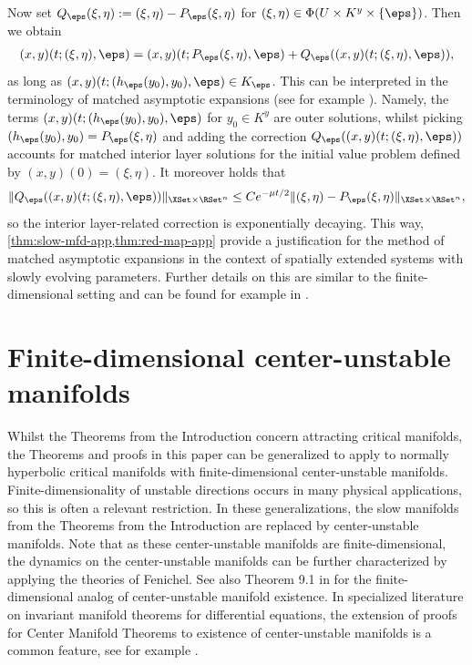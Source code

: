 \documentclass[a4paper]{siamart190516}
\begin{document}
 Now set $Q_{\eps}(\xi,\eta) := (\xi,\eta) - P_{\eps} (\xi,\eta)$ for $(\xi,\eta) \in \Phi(U \times K^y \times \{ \eps\})$. Then we obtain
\begin{align*}
(x,y)(t; (\xi,\eta),\eps) =  (x,y)(t; P_{\eps}(\xi,\eta),\eps) + Q_{\eps}((x,y)(t; (\xi,\eta),\eps)),
\end{align*}
as long as $(x,y)(t; (h_{\eps}(y_0),y_0),\eps) \in K_{\eps}$. This can be interpreted in the terminology of matched asymptotic expansions (see for example \cite{Ve05}). Namely, the terms $(x,y)(t; (h_{\eps}(y_0),y_0),\eps)$ for $y_0 \in K^y$ are outer solutions, whilst picking $(h_{\eps}(y_0),y_0) = P_{\eps}(\xi,\eta)$ and adding the correction $Q_{\eps}((x,y)(t; (\xi,\eta),\eps))$ accounts for matched interior layer solutions for the initial value problem defined by $(x,y)(0) = (\xi,\eta)$. It moreover holds that
\[
 \| Q_{\eps}((x,y)(t; (\xi,\eta),\eps)) \|_{\XSet \times \RSet^n} \leq  C e^{-\mu t / 2} \| (\xi,\eta) - P_{\eps}(\xi,\eta) \|_{\XSet \times \RSet^n},
\]
so the interior layer-related correction is exponentially decaying. This way,
\cref{thm:slow-mfd-app,thm:red-map-app} provide a justification for the
method of matched asymptotic expansions in the context of spatially extended systems
with slowly evolving parameters. Further details on this are similar to the
finite-dimensional setting and can be found for example in \cite{Sa90, DJFu96, Ve05}. 



  
  \section{Finite-dimensional center-unstable manifolds}\label{sec:cu-manifolds}
 Whilst the Theorems from the Introduction concern attracting critical manifolds, the Theorems and proofs in this paper can be generalized to apply to normally hyperbolic critical manifolds with finite-dimensional center-unstable manifolds. Finite-dimensionality of unstable directions occurs in many physical applications, so this is often a relevant restriction. In these generalizations, the slow manifolds from the Theorems from the Introduction are replaced by center-unstable manifolds. Note that as these center-unstable manifolds are finite-dimensional, the dynamics on the center-unstable manifolds can be further characterized by applying the theories of Fenichel. See also Theorem 9.1 in \cite{Fe79} for the finite-dimensional analog of center-unstable manifold existence. In specialized literature on invariant manifold theorems for differential equations, the extension of proofs for Center Manifold Theorems to existence of center-unstable manifolds is a common feature, see for example \cite{Ke67, HiPuSh77, Sh-ea98, HoKn24}.
 
\end{document}
